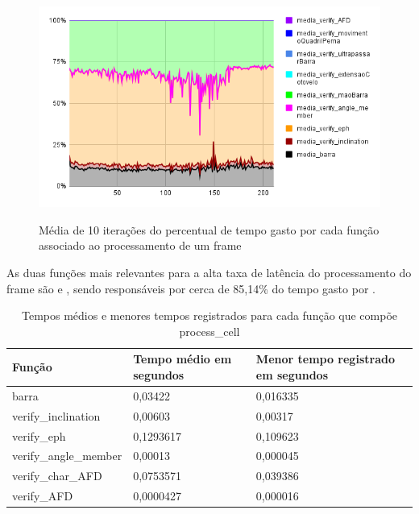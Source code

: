 \begin{figure}[H]
	\centering
	\caption{Média de 10 iterações do percentual de tempo gasto por cada função associado ao processamento de um frame}
	\includegraphics[scale=0.7]{figuras/grafico/comp_process_cell_1.png}
	\label{graf:G14}
\end{figure}

As duas funções mais relevantes para a alta taxa de latência do processamento do frame são  e , sendo responsáveis por cerca de 85,14\% do tempo gasto por .

\begin{table}[h]
	\centering
	\begin{tabular}{|p{6cm}|p{3cm}|p{5cm}|}
	\hline
	\textbf{Função} & \textbf{Tempo médio em segundos} & \textbf{Menor tempo registrado em segundos} \\
	\hline
	barra & 0,03422 & 0,016335 \\
	verify\_inclination & 0,00603 & 0,00317 \\
	verify\_eph & 0,1293617 & 0,109623 \\
	verify\_angle\_member & 0,00013 & 0,000045 \\
	verify\_char\_AFD & 0,0753571 & 0,039386 \\
	verify\_AFD & 0,0000427 & 0,000016 \\
	\hline
	\end{tabular}
	\caption{Tempos médios e menores tempos registrados para cada função que compõe process\_cell}
	\label{tab:tempos_funcoes}
\end{table}



